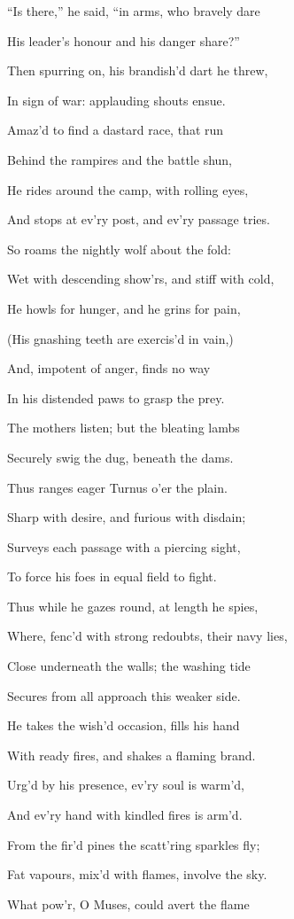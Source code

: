 “Is there,” he said, “in arms, who bravely dare

His leader’s honour and his danger share?”

Then spurring on, his brandish’d dart he threw,

In sign of war: applauding shouts ensue.

Amaz’d to find a dastard race, that run

Behind the rampires and the battle shun,

He rides around the camp, with rolling eyes,

And stops at ev’ry post, and ev’ry passage tries.

So roams the nightly wolf about the fold:

Wet with descending show’rs, and stiff with cold,

He howls for hunger, and he grins for pain,

(His gnashing teeth are exercis’d in vain,)

And, impotent of anger, finds no way

In his distended paws to grasp the prey.

The mothers listen; but the bleating lambs

Securely swig the dug, beneath the dams.

Thus ranges eager Turnus o’er the plain.

Sharp with desire, and furious with disdain;

Surveys each passage with a piercing sight,

To force his foes in equal field to fight.

Thus while he gazes round, at length he spies,

Where, fenc’d with strong redoubts, their navy lies,

Close underneath the walls; the washing tide

Secures from all approach this weaker side.

He takes the wish’d occasion, fills his hand

With ready fires, and shakes a flaming brand.

Urg’d by his presence, ev’ry soul is warm’d,

And ev’ry hand with kindled fires is arm’d.

From the fir’d pines the scatt’ring sparkles fly;

Fat vapours, mix’d with flames, involve the sky.

What pow’r, O Muses, could avert the flame

